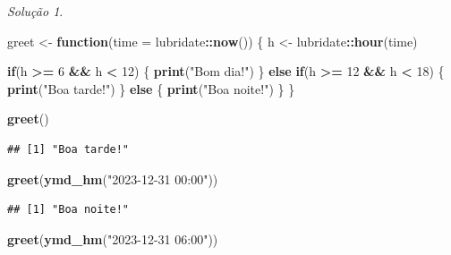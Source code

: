 \documentclass[
]{latex/krantz}
\newenvironment{Shaded}{\begin{snugshade}}{\end{snugshade}}
\newcommand{\AttributeTok}[1]{\textcolor[rgb]{0.13,0.29,0.53}{#1}}
\newcommand{\ControlFlowTok}[1]{\textcolor[rgb]{0.13,0.29,0.53}{\textbf{#1}}}
\newcommand{\DecValTok}[1]{\textcolor[rgb]{0.00,0.00,0.81}{#1}}
\newcommand{\FunctionTok}[1]{\textcolor[rgb]{0.13,0.29,0.53}{\textbf{#1}}}
\newcommand{\NormalTok}[1]{#1}
\newcommand{\OtherTok}[1]{\textcolor[rgb]{0.56,0.35,0.01}{#1}}
\newcommand{\SpecialCharTok}[1]{\textcolor[rgb]{0.81,0.36,0.00}{\textbf{#1}}}
\newcommand{\StringTok}[1]{\textcolor[rgb]{0.31,0.60,0.02}{#1}}
\theoremstyle{definition}
\theoremstyle{definition}
\theoremstyle{definition}
\theoremstyle{definition}
\theoremstyle{remark}
\newtheorem*{solution}{Solução}
\begin{document}
\begin{solution}
\leavevmode

\begin{Shaded}
\begin{Highlighting}[]
\NormalTok{greet }\OtherTok{\textless{}{-}} \ControlFlowTok{function}\NormalTok{(}\AttributeTok{time =}\NormalTok{ lubridate}\SpecialCharTok{::}\FunctionTok{now}\NormalTok{()) \{}
\NormalTok{  h }\OtherTok{\textless{}{-}}\NormalTok{ lubridate}\SpecialCharTok{::}\FunctionTok{hour}\NormalTok{(time)}
  
  \ControlFlowTok{if}\NormalTok{(h }\SpecialCharTok{\textgreater{}=} \DecValTok{6} \SpecialCharTok{\&\&}\NormalTok{ h }\SpecialCharTok{\textless{}} \DecValTok{12}\NormalTok{) \{}
    \FunctionTok{print}\NormalTok{(}\StringTok{"Bom dia!"}\NormalTok{)}
\NormalTok{  \} }\ControlFlowTok{else} \ControlFlowTok{if}\NormalTok{(h }\SpecialCharTok{\textgreater{}=} \DecValTok{12} \SpecialCharTok{\&\&}\NormalTok{ h }\SpecialCharTok{\textless{}} \DecValTok{18}\NormalTok{) \{}
    \FunctionTok{print}\NormalTok{(}\StringTok{"Boa tarde!"}\NormalTok{)}
\NormalTok{  \} }\ControlFlowTok{else}\NormalTok{ \{}
    \FunctionTok{print}\NormalTok{(}\StringTok{"Boa noite!"}\NormalTok{)}
\NormalTok{  \}}
\NormalTok{\}}

\FunctionTok{greet}\NormalTok{()}
\end{Highlighting}
\end{Shaded}

\begin{verbatim}
## [1] "Boa tarde!"
\end{verbatim}

\begin{Shaded}
\begin{Highlighting}[]
\FunctionTok{greet}\NormalTok{(}\FunctionTok{ymd\_hm}\NormalTok{(}\StringTok{"2023{-}12{-}31 00:00"}\NormalTok{))}
\end{Highlighting}
\end{Shaded}

\begin{verbatim}
## [1] "Boa noite!"
\end{verbatim}

\begin{Shaded}
\begin{Highlighting}[]
\FunctionTok{greet}\NormalTok{(}\FunctionTok{ymd\_hm}\NormalTok{(}\StringTok{"2023{-}12{-}31 06:00"}\NormalTok{))}
\end{Highlighting}
\end{Shaded}


\end{solution}
\end{document}
